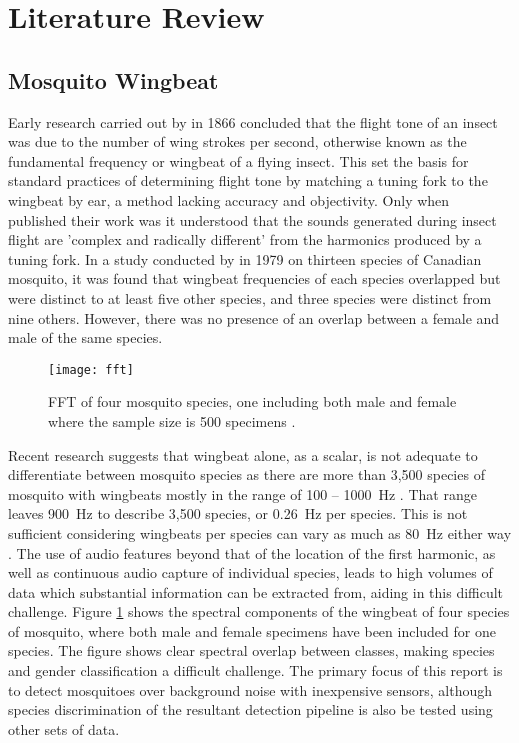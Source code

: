 \section{Literature Review}
\label{sec:bg-litreview}

    \subsection{Mosquito Wingbeat}
    \label{subsec:bg-litreview-mozz}
        
        Early research carried out by \textcite{Landois1866} in 1866 concluded that the flight tone of an insect was due to the number of wing strokes per second, otherwise known as the fundamental frequency or wingbeat of a flying insect. This set the basis for standard practices of determining flight tone by matching a tuning fork to the wingbeat by ear, a method lacking accuracy and objectivity. Only when \textcite{Williams1950} published their work was it understood that the sounds generated during insect flight are 'complex and radically different' from the harmonics produced by a tuning fork. In a study conducted by \textcite{Belton1979} in 1979 on thirteen species of Canadian mosquito, it was found that wingbeat frequencies of each species overlapped but were distinct to at least five other species, and three species were distinct from nine others. However, there was no presence of an overlap between a female and male of the same species. 
        \begin{figure}[ht]
            \centering
            \texttt{[image: fft]}
            \caption{FFT of four mosquito species, one including both male and female where the sample size is 500 specimens \cite{Chen2014}.}
            \label{fig:bg-litreview-mozz-fft}
        \end{figure}
        Recent research suggests that wingbeat alone, as a scalar, is not adequate to differentiate between mosquito species as there are more than 3,500 species of mosquito with wingbeats mostly in the range of \SI{100}{} -- \SI{1000}{\hertz} \cite{Chen2014}. That range leaves \SI{900}{\hertz} to describe 3,500 species, or \SI{0.26}{\hertz} per species. This is not sufficient considering wingbeats per species can vary as much as \SI{80}{\hertz} either way \cite{Arthur2014}. The use of audio features beyond that of the location of the first harmonic, as well as continuous audio capture of individual species, leads to high volumes of data which substantial information can be extracted from, aiding in this difficult challenge. Figure \ref{fig:bg-litreview-mozz-fft} shows the spectral components of the wingbeat of four species of mosquito, where both male and female specimens have been included for one species. The figure shows clear spectral overlap between classes, making species and gender classification a difficult challenge. The primary focus of this report is to detect mosquitoes over background noise with inexpensive sensors, although species discrimination of the resultant detection pipeline is also be tested using other sets of data.
